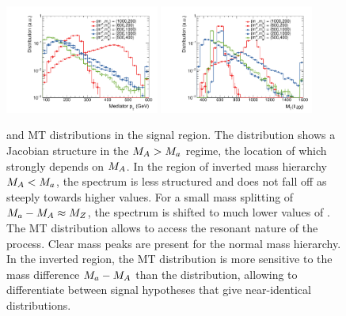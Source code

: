 \begin{figure}
\centering
\includegraphics[width=0.45\textwidth]{texinputs/04_grid/figures/monoz/leptonic/dmwg-final_h_pt_med_dm.pdf}
\includegraphics[width=0.45\textwidth]{texinputs/04_grid/figures/monoz/leptonic/dmwg-final_h_mt_total.pdf}
\caption{\MET and  MT distributions in the signal region. The \MET distribution shows a Jacobian structure in the $M_{A} > M_{a}$ regime, the location of which strongly depends on $M_{A}$. In the region of inverted mass hierarchy $M_{A} < M_{a}$, the spectrum is less structured and does not fall off as steeply towards higher values. For a small mass splitting of $M_{a}-M_{A}\approx M_{Z}$, the spectrum is shifted to much lower values of \MET. The MT distribution allows to access the resonant nature of the process. Clear mass peaks are present for the normal mass hierarchy. In the inverted region, the MT distribution is more sensitive to the mass difference $M_{a}-M_{A}$ than the \MET distribution, allowing to differentiate between signal hypotheses that give near-identical \MET distributions. }
\label{fig:monoz_kin_final}
\end{figure}


